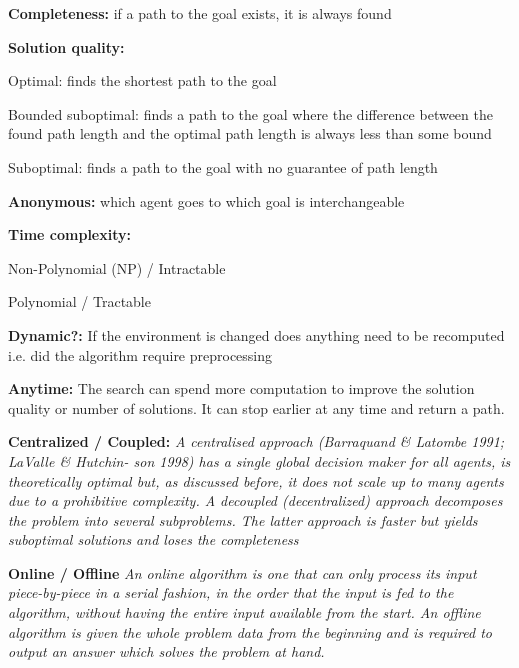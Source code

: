 \documentclass[a4paper,11pt]{article}
\begin{document}
{\setlength{\parindent}{0cm}

\textbf{Completeness:} if a path to the goal exists, it is always found

\textbf{Solution quality:}
	\begin{compactitem}
		\item Optimal: finds the shortest path to the goal
		\item Bounded suboptimal: finds a path to the goal where the difference between the found path length and the optimal path length is always less than some bound
		\item Suboptimal: finds a path to the goal with no guarantee of path length
	\end{compactitem}

\textbf{Anonymous:} which agent goes to which goal is interchangeable

\textbf{Time complexity:}
	\begin{compactitem}
		\item Non-Polynomial (NP) / Intractable
		\item Polynomial / Tractable
	\end{compactitem}

\textbf{Dynamic?:} If the environment is changed does anything need to be recomputed i.e. did the algorithm require preprocessing

\textbf{Anytime:} The search can spend more computation to improve the solution quality or number of solutions. It can stop earlier at any time and return a path.

\textbf{Centralized / Coupled:} \textit{A centralised approach (Barraquand \& Latombe 1991; LaValle \& Hutchin- son 1998) has a single global decision maker for all agents, is theoretically optimal but, as discussed before, it does not scale up to many agents due to a prohibitive complexity. A decoupled (decentralized) approach decomposes the problem into several subproblems. The latter approach is faster but yields suboptimal solutions and loses the completeness} \cite{wang2008fast}

\textbf{Online / Offline} \textit{An online algorithm is one that can only process its input piece-by-piece in a serial fashion, in the order that the input is fed to the algorithm, without having the entire input available from the start. An offline algorithm is given the whole problem data from the beginning and is required to output an answer which solves the problem at hand.}
} %
\end{document}
